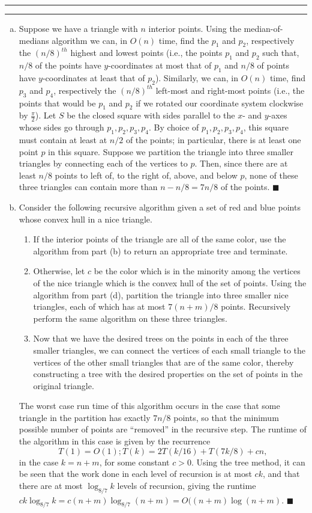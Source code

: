 \documentclass[11pt]{article}
\newcounter{questionCounter}
\newcounter{partCounter}[questionCounter]
\newenvironment{question}[2][\arabic{questionCounter}]{%
    \setcounter{partCounter}{0}%
    \vspace{.25in} \hrule \vspace{0.5em}%
        \noindent{\bf #2}%
    \vspace{0.8em} \hrule \vspace{.10in}%
    \addtocounter{questionCounter}{1}%
}{}
\begin{document}
\begin{question}{Connecting Dots, aka. Geometric Quick Sort}
\begin{enumerate}[(a)]
\item Suppose we have a triangle with $n$ interior points. Using the
median-of-medians algorithm we can, in $O(n)$ time, find the $p_1$ and $p_2$,
respectively the $(n/8)^{th}$ highest and lowest points (i.e., the points
$p_1$ and $p_2$ such that, $n/8$ of the points have $y$-coordinates at most
that of $p_1$ and $n/8$ of points have $y$-coordinates at least that of
$p_2$). Similarly, we can, in $O(n)$ time, find $p_3$ and $p_4$, respectively
the $(n/8)^{th}$ left-most and right-most points (i.e., the points that would
be $p_1$ and $p_2$ if we rotated our coordinate system clockwise by
$\frac{\pi}{2}$). Let $S$ be the closed square with sides parallel to the $x$-
and $y$-axes whose sides go through $p_1,p_2,p_3,p_4$. By choice of
$p_1,p_2,p_3,p_4$, this square must contain at least at $n/2$ of the points;
in particular, there is at least one point $p$ in this square. Suppose we
partition the triangle into three smaller triangles by connecting each of the
vertices to $p$. Then, since there are at least $n/8$ points to left of, to
the right of, above, and below $p$, none of these three triangles can contain
more than $n - n/8 = 7n/8$ of the points. \qquad $\blacksquare$

\item Consider the following recursive algorithm given a set of red and blue
points whose convex hull in a nice triangle.
\begin{enumerate}[1.]
\item If the interior points of the triangle are all of the same color,
use the algorithm from part (b) to return an appropriate tree and terminate.
\item Otherwise, let $c$ be the color which is in the minority among the
vertices of the nice triangle which is the convex hull of the set of points.
Using the algorithm from part (d), partition the triangle into three smaller
nice triangles, each of which has at most $7(n + m)/8$ points. Recursively
perform the same algorithm on these three triangles.
\item Now that we have the desired trees on the points in each of the three
smaller triangles, we can connect the vertices of each small triangle to the
vertices of the other small triangles that are of the same color, thereby
constructing a tree with the desired properties on the set of points in the
original triangle.
\end{enumerate}

The worst case run time of this algorithm occurs in the case that some
triangle in the partition has exactly $7n/8$ points, so that the minimum
possible number of points are ``removed'' in the recursive step. The runtime
of the algorithm in this case is given by the recurrence
\[T(1) = O(1); T(k) = 2T(k/16) + T(7k/8) + cn,\]
in the case $k = n + m$, for some constant $c > 0$. Using the tree method, it
can be seen that the work done in each level of recursion is at most $ck$,
and that there are at most $\log_{8/7} k$ levels of recursion, giving the
runtime $ck \log_{8/7} k = c(n + m)\log_{8/7}(n + m) = O((n + m)\log(n + m).$
\qquad $\blacksquare$


\end{enumerate}
\end{question}
\end{document}
